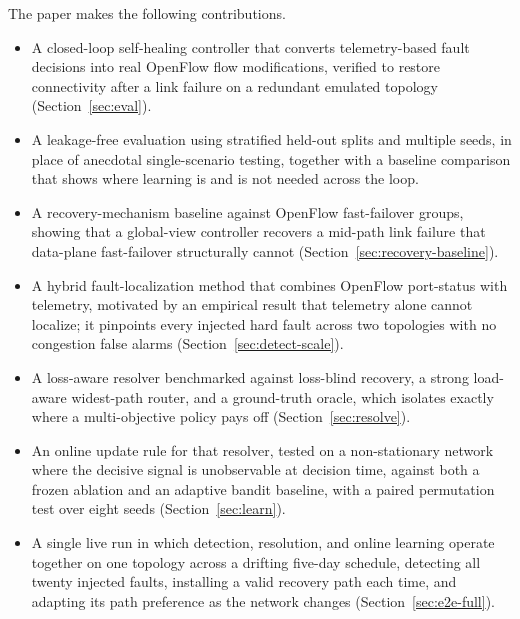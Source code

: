 \documentclass[conference]{IEEEtran}
\begin{document}
The paper makes the following contributions.
\begin{itemize}
  \item A closed-loop self-healing controller that converts telemetry-based fault
  decisions into real OpenFlow flow modifications, verified to restore connectivity
  after a link failure on a redundant emulated topology (Section~\ref{sec:eval}).
  \item A leakage-free evaluation using stratified held-out splits and multiple
  seeds, in place of anecdotal single-scenario testing, together with a baseline
  comparison that shows where learning is and is not needed across the loop.
  \item A recovery-mechanism baseline against OpenFlow fast-failover groups, showing
  that a global-view controller recovers a mid-path link failure that data-plane
  fast-failover structurally cannot (Section~\ref{sec:recovery-baseline}).
  \item A hybrid fault-localization method that combines OpenFlow port-status with
  telemetry, motivated by an empirical result that telemetry alone cannot localize;
  it pinpoints every injected hard fault across two topologies with no congestion
  false alarms (Section~\ref{sec:detect-scale}).
  \item A loss-aware resolver benchmarked against loss-blind recovery, a strong
  load-aware widest-path router, and a ground-truth oracle, which isolates exactly
  where a multi-objective policy pays off (Section~\ref{sec:resolve}).
  \item An online update rule for that resolver, tested on a non-stationary network
  where the decisive signal is unobservable at decision time, against both a frozen
  ablation and an adaptive bandit baseline, with a paired permutation test over eight
  seeds (Section~\ref{sec:learn}).
  \item A single live run in which detection, resolution, and online learning operate
  together on one topology across a drifting five-day schedule, detecting all twenty
  injected faults, installing a valid recovery path each time, and adapting its path
  preference as the network changes (Section~\ref{sec:e2e-full}).
\end{itemize}
\end{document}
